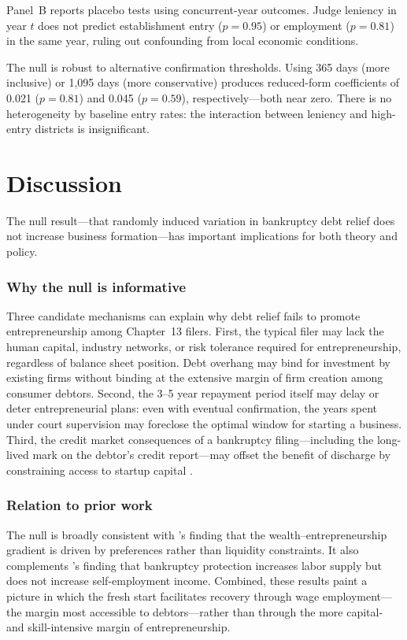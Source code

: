 \documentclass[12pt]{article}
\begin{document}
Panel~B reports placebo tests using concurrent-year outcomes. Judge leniency in year $t$ does not predict establishment entry ($p=0.95$) or employment ($p=0.81$) in the same year, ruling out confounding from local economic conditions.

The null is robust to alternative confirmation thresholds. Using 365 days (more inclusive) or 1,095 days (more conservative) produces reduced-form coefficients of 0.021 ($p=0.81$) and 0.045 ($p=0.59$), respectively---both near zero. There is no heterogeneity by baseline entry rates: the interaction between leniency and high-entry districts is insignificant.

\section{Discussion}
\label{sec:discussion}

The null result---that randomly induced variation in bankruptcy debt relief does not increase business formation---has important implications for both theory and policy.

\subsubsection*{Why the null is informative} Three candidate mechanisms can explain why debt relief fails to promote entrepreneurship among Chapter~13 filers. First, the typical filer may lack the human capital, industry networks, or risk tolerance required for entrepreneurship, regardless of balance sheet position. Debt overhang may bind for investment by existing firms \citep{myers1977} without binding at the extensive margin of firm creation among consumer debtors. Second, the 3--5 year repayment period itself may delay or deter entrepreneurial plans: even with eventual confirmation, the years spent under court supervision may foreclose the optimal window for starting a business. Third, the credit market consequences of a bankruptcy filing---including the long-lived mark on the debtor's credit report---may offset the benefit of discharge by constraining access to startup capital \citep{keys2020}.

\subsubsection*{Relation to prior work} The null is broadly consistent with \citet{hurst2004}'s finding that the wealth--entrepreneurship gradient is driven by preferences rather than liquidity constraints. It also complements \citet{dobbie2015}'s finding that bankruptcy protection increases labor supply but does not increase self-employment income. Combined, these results paint a picture in which the fresh start facilitates recovery through wage employment---the margin most accessible to debtors---rather than through the more capital- and skill-intensive margin of entrepreneurship.
\end{document}
